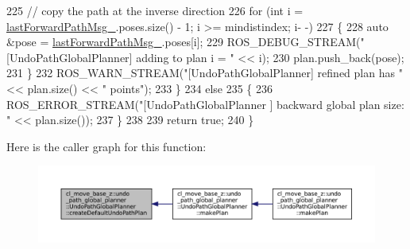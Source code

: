 \begin{DoxyCode}
225                 \textcolor{comment}{// copy the path at the inverse direction}
226                 \textcolor{keywordflow}{for} (\textcolor{keywordtype}{int} i = \hyperlink{classcl__move__base__z_1_1undo__path__global__planner_1_1UndoPathGlobalPlanner_a9a4a6e40f5b6cb5f77dedbc5b6170871}{lastForwardPathMsg\_}.poses.size() - 1; i >= mindistindex; i-
      -)
227                 \{
228                     \textcolor{keyword}{auto} &pose = \hyperlink{classcl__move__base__z_1_1undo__path__global__planner_1_1UndoPathGlobalPlanner_a9a4a6e40f5b6cb5f77dedbc5b6170871}{lastForwardPathMsg\_}.poses[i];
229                     ROS\_DEBUG\_STREAM(\textcolor{stringliteral}{"[UndoPathGlobalPlanner] adding to plan i = "} << i);
230                     plan.push\_back(pose);
231                 \}
232                 ROS\_WARN\_STREAM(\textcolor{stringliteral}{"[UndoPathGlobalPlanner] refined plan has "} << plan.size() << \textcolor{stringliteral}{"  points"});
233             \}
234             \textcolor{keywordflow}{else}
235             \{
236                 ROS\_ERROR\_STREAM(\textcolor{stringliteral}{"[UndoPathGlobalPlanner ] backward global plan size:  "} << plan.size());
237             \}
238 
239             \textcolor{keywordflow}{return} \textcolor{keyword}{true};
240         \}
\end{DoxyCode}
Here is the caller graph for this function\+:
\nopagebreak
\begin{figure}[H]
\begin{center}
\leavevmode
\includegraphics[width=350pt]{classcl__move__base__z_1_1undo__path__global__planner_1_1UndoPathGlobalPlanner_a659c16f439d33ac7026a54bb65c26ca8_icgraph}
\end{center}
\end{figure}
\mbox{\label{classcl__move__base__z_1_1undo__path__global__planner_1_1UndoPathGlobalPlanner_a69e0fbb98872f108f679b2a6620638f5}} 
